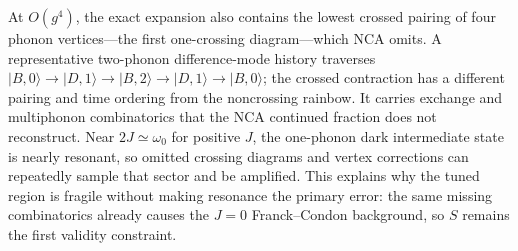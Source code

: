 \documentclass[11pt]{article}
\newcommand{\ket}[1]{\lvert #1\rangle}
\begin{document}
At $O(g^4)$, the exact expansion also contains the lowest crossed pairing of
four phonon vertices---the first one-crossing diagram---which NCA omits.  A
representative two-phonon
difference-mode history traverses
$\ket{B,0}\rightarrow\ket{D,1}\rightarrow\ket{B,2}
\rightarrow\ket{D,1}\rightarrow\ket{B,0}$; the crossed contraction has a
different pairing and time ordering from the noncrossing rainbow.  It carries
exchange and multiphonon combinatorics that the NCA continued fraction does
not reconstruct.  Near $2J\simeq\omega_0$ for positive $J$, the one-phonon
dark intermediate state is nearly resonant, so omitted crossing diagrams and
vertex corrections can repeatedly sample that sector and be amplified.  This
explains why
the tuned region is fragile without making resonance the primary error: the
same missing combinatorics already causes the $J=0$ Franck--Condon background,
so $S$ remains the first validity constraint.
\end{document}
